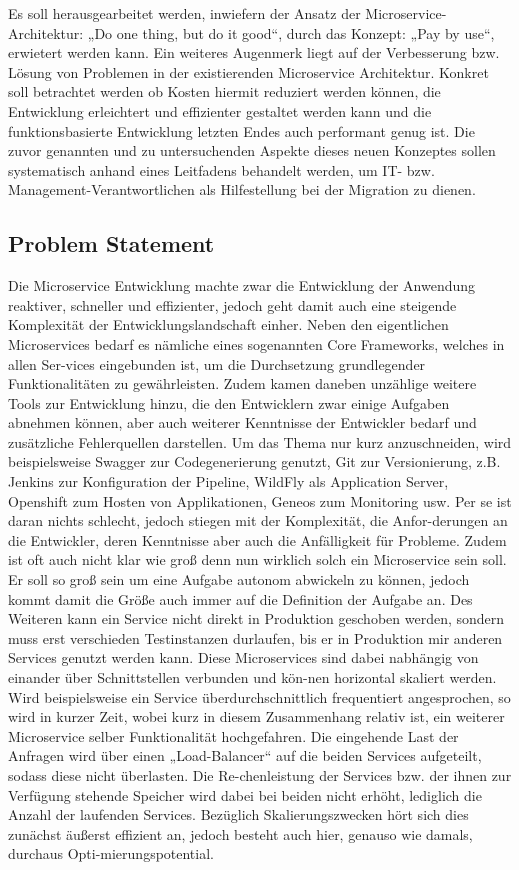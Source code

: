 \documentclass[a4paper,twoside,11pt, pagesize]{scrartcl}
\begin{document}
Es soll herausgearbeitet werden, inwiefern der Ansatz der Microservice-Architektur: „Do one thing, but do it good“, durch das Konzept: „Pay by use“, erwietert werden kann. Ein weiteres Augenmerk liegt auf der Verbesserung bzw. Lösung von Problemen in der existierenden Microservice Architektur. Konkret soll betrachtet werden ob Kosten hiermit reduziert werden können, die Entwicklung erleichtert und effizienter gestaltet werden kann und die funktionsbasierte Entwicklung letzten Endes auch performant genug ist. 
Die zuvor genannten und zu untersuchenden Aspekte dieses neuen Konzeptes sollen systematisch anhand eines Leitfadens behandelt werden, um IT- bzw. Management-Verantwortlichen als Hilfestellung bei der Migration zu dienen. 
\subsection{Problem Statement}
Die Microservice Entwicklung machte zwar die Entwicklung der Anwendung reaktiver, schneller und effizienter, jedoch geht damit auch eine steigende Komplexität der Entwicklungslandschaft einher. Neben den eigentlichen Microservices bedarf es nämliche eines sogenannten Core Frameworks, welches in allen Ser-vices eingebunden ist, um die Durchsetzung grundlegender Funktionalitäten zu gewährleisten. Zudem kamen daneben unzählige weitere Tools zur Entwicklung hinzu, die den Entwicklern zwar einige Aufgaben abnehmen können, aber auch weiterer Kenntnisse der Entwickler bedarf und zusätzliche Fehlerquellen darstellen. Um das Thema nur kurz anzuschneiden, wird beispielsweise Swagger zur Codegenerierung genutzt, Git zur Versionierung, z.B. Jenkins zur Konfiguration der Pipeline, WildFly als Application Server, Openshift zum Hosten von Applikationen, Geneos zum Monitoring usw. Per se ist daran nichts schlecht, jedoch stiegen mit der Komplexität, die Anfor-derungen an die Entwickler, deren Kenntnisse aber auch die Anfälligkeit für Probleme. 
Zudem ist oft auch nicht klar wie groß denn nun wirklich solch ein Microservice sein soll. Er soll so groß sein um eine Aufgabe autonom abwickeln zu können, jedoch kommt damit die Größe auch immer auf die Definition der Aufgabe an. Des Weiteren kann ein Service nicht direkt in Produktion geschoben werden, sondern muss erst verschieden Testinstanzen durlaufen, bis er in Produktion mir anderen Services genutzt werden kann.
Diese Microservices sind dabei nabhängig von einander über Schnittstellen verbunden und kön-nen horizontal skaliert werden. Wird beispielsweise ein Service überdurchschnittlich frequentiert angesprochen, so wird in kurzer Zeit, wobei kurz in diesem Zusammenhang relativ ist, ein weiterer Microservice selber Funktionalität hochgefahren. Die eingehende Last der Anfragen wird über einen „Load-Balancer“ auf die beiden Services aufgeteilt, sodass diese nicht überlasten. Die Re-chenleistung der Services bzw. der ihnen zur Verfügung stehende Speicher wird dabei bei beiden nicht erhöht, lediglich die Anzahl der laufenden Services. Bezüglich Skalierungszwecken hört sich dies zunächst äußerst effizient an, jedoch besteht auch hier, genauso wie damals, durchaus Opti-mierungspotential.
\end{document}
